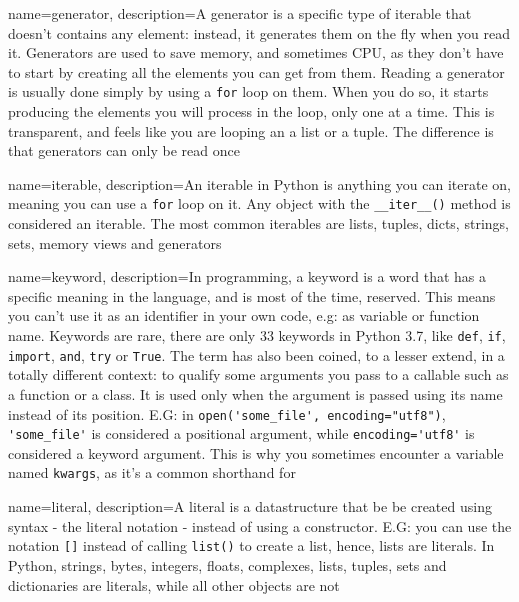 {
    name=generator,
    description={A generator is a specific type of \gls{iterable} that doesn't contains any element: instead, it generates them on the fly when you read it. Generators are used to save memory, and sometimes CPU, as they don't have to start by creating all the elements you can get from them. Reading a generator is usually done simply by using a \lstinline{for} loop on them. When you do so, it starts producing the elements you will process in the loop, only one at a time. This is transparent, and feels like you are looping an a list or a tuple. The difference is that generators can only be read once}
}


{
    name=iterable,
    description={An iterable in Python is anything you can iterate on, meaning you can use a \lstinline{for} loop on it. Any object with the \lstinline{__iter__()} method is considered an iterable. The most common iterables are lists, tuples, dicts, strings, sets, memory views and generators}
}


{
    name=keyword,
    description={In programming, a keyword is a word that has a specific meaning in the language, and is most of the time, reserved. This means you can't use it as an identifier in your own code, e.g: as variable or function name. Keywords are rare, there are only 33 keywords in Python 3.7, like \lstinline{def}, \lstinline{if}, \lstinline{import}, \lstinline{and}, \lstinline{try} or \lstinline{True}. The term  has also been coined, to a lesser extend, in a totally different context: to qualify some arguments you pass to a \gls{callable} such as a function or a class. It is used only when the argument is passed using its name instead of its position. E.G: in \lstinline{open('some_file', encoding="utf8")}, \lstinline{'some_file'} is considered a positional argument, while \lstinline{encoding='utf8'} is considered a keyword argument. This is why you sometimes encounter a variable named \lstinline{kwargs}, as it's a common shorthand for }
}

{
    name=literal,
    description={A literal is a datastructure that be be created using syntax - the literal notation - instead of using a constructor. E.G: you can use the notation \lstinline{[]} instead of calling  \lstinline{list()} to create a list, hence, lists are literals. In Python, strings, bytes, integers, floats, complexes, lists, tuples, sets and dictionaries are literals, while all other objects are not}
}

